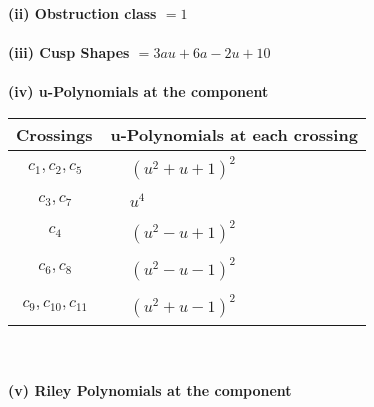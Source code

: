 \documentclass[1p]{elsarticle_modified}
\theoremstyle{definition}
\begin{document}
\flushleft \textbf{(ii) Obstruction class $= 1$}\\~\\
\flushleft \textbf{(iii) Cusp Shapes $= 3 a u+6 a-2 u+10$}\\~\\
\newpage\renewcommand{\arraystretch}{1}
\flushleft \textbf{(iv) u-Polynomials at the component}\newline \\
\begin{tabular}{m{50pt}|m{274pt}}
Crossings & \hspace{64pt}u-Polynomials at each crossing \\
\hline $$\begin{aligned}c_{1},c_{2},c_{5}\end{aligned}$$&$\begin{aligned}
&(u^2+u+1)^2
\end{aligned}$\\
\hline $$\begin{aligned}c_{3},c_{7}\end{aligned}$$&$\begin{aligned}
&u^4
\end{aligned}$\\
\hline $$\begin{aligned}c_{4}\end{aligned}$$&$\begin{aligned}
&(u^2- u+1)^2
\end{aligned}$\\
\hline $$\begin{aligned}c_{6},c_{8}\end{aligned}$$&$\begin{aligned}
&(u^2- u-1)^2
\end{aligned}$\\
\hline $$\begin{aligned}c_{9},c_{10},c_{11}\end{aligned}$$&$\begin{aligned}
&(u^2+u-1)^2
\end{aligned}$\\
\hline
\end{tabular}\\~\\
\newpage\renewcommand{\arraystretch}{1}
\flushleft \textbf{(v) Riley Polynomials at the component}\newline \\
\end{document}
